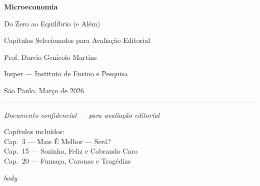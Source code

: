 \documentclass[11pt,twoside,openright]{book}
\begin{document}
\begin{titlepage}
\begin{center}
\vspace*{3cm}

{\fontsize{32}{38}\selectfont\sffamily\bfseries\textcolor{insper}{Microeconomia}}

\vspace{0.4cm}

{\fontsize{16}{20}\selectfont\sffamily Do Zero ao Equilíbrio (e Além)}

\vspace{2cm}

{\Large\sffamily Capítulos Selecionados para Avaliação Editorial}

\vspace{1.5cm}

{\large\sffamily Prof. Darcio Genicolo Martins}

{\normalsize\sffamily Insper — Instituto de Ensino e Pesquisa}

\vspace{0.5cm}

{\normalsize\sffamily São Paulo, Março de 2026}

\vspace{3cm}

\rule{0.4\textwidth}{0.5pt}

\vspace{0.3cm}

{\small\itshape Documento confidencial — para avaliação editorial}

\vspace{1cm}

{\small\sffamily Capítulos incluídos:}\\[6pt]
{\small Cap.\ 3 — Mais É Melhor — Será?}\\
{\small Cap.\ 15 — Sozinho, Feliz e Cobrando Caro}\\
{\small Cap.\ 20 — Fumaça, Caronas e Tragédias}

\end{center}
\end{titlepage}

\tableofcontents
\newpage

$body$
\end{document}

